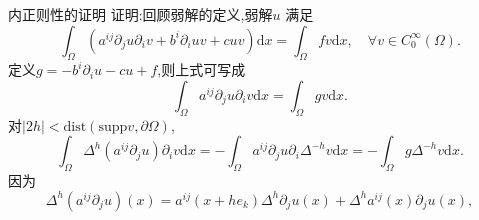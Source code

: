 \begin{frame}{内正则性的证明}
  证明:回顾弱解的定义,弱解$u$ 满足
  \[
    \int_{\Omega}\left( a^{ij}\partial_j u\partial_iv+b^{i}\partial_i u v +cuv \right) \mathrm{d}x=\int_{\Omega}fv\mathrm{d}x,\quad \forall v\in C_0^{\infty}(\Omega).
  \] 
  定义$g=-b^{i}\partial_i u-cu+f$,则上式可写成
  \[
    \int_{\Omega}a^{ij}\partial_j u\partial_iv\mathrm{d}x=\int_{\Omega}gv\mathrm{d}x.
  \]
  对$|2h|<\mathrm{dist}(\mathrm{supp}v,\partial \Omega)$,
  \[
    \int_{\Omega}\Delta^{h}(a^{ij}\partial_j u)\partial_i v \mathrm{d}x = -\int_{\Omega}a^{ij}\partial_ju \partial_i \Delta^{-h}v \mathrm{d}x=-\int_{\Omega}g \Delta^{-h}v \mathrm{d}x.
  \] 因为
    \[
      \Delta^{h}(a^{ij}\partial_j u )(x)=a^{ij}(x+he_k)\Delta^{h}\partial_j u(x)+\Delta^{h}a^{ij}(x)\partial_ju(x),
    \] 
\end{frame}

